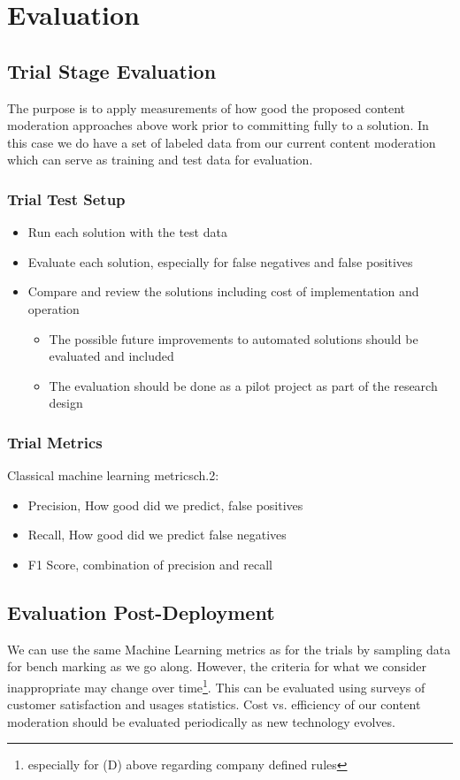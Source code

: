 \documentclass[
	letterpaper, %
	12pt, %
	unnumberedsections, %
	twoside, %
]{LTJournalArticle}
\begin{document}
\section{Evaluation}

\subsection{Trial Stage Evaluation}
The purpose is to apply measurements of how good the proposed content moderation approaches above work prior to committing fully to a solution. In this case we do have a set of labeled data from our current content moderation which can serve as training and test data for evaluation.

\subsubsection*{Trial Test Setup}
\begin{itemize}
	\item Run each solution with the test data
	\item Evaluate each solution, especially for false negatives and false positives
	\item Compare and review the solutions including cost of implementation and operation
	      \begin{itemize}
		      \item The possible future improvements to automated solutions should be evaluated and included
		      \item The evaluation should be done as a pilot project as part of the research design
	      \end{itemize}
\end{itemize}

\subsubsection*{Trial Metrics}
Classical machine learning metrics\cite{ClarenceChio}ch.2:
\begin{itemize}
	\item Precision, How good did we predict, false positives
	\item Recall, How good did we predict false negatives
	\item F1 Score, combination of precision and recall
\end{itemize}

\subsection{Evaluation Post-Deployment}
We can use the same Machine Learning metrics as for the trials by sampling data for bench marking as we go along. However, the criteria for what we consider inappropriate may change over time\footnote{especially for (D) above regarding company defined rules}. This can be evaluated using surveys of customer satisfaction and usages statistics. Cost vs. efficiency of our content moderation should be evaluated periodically as new technology evolves.
\end{document}
